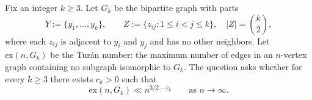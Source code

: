 Fix an integer $k\ge 3$.
Let $G_k$ be the bipartite graph with parts
\[
Y:=\{y_1,\dots,y_k\},\qquad Z:=\{z_{ij}: 1\le i<j\le k\},\quad |Z|=\binom{k}{2},
\]
where each $z_{ij}$ is adjacent to $y_i$ and $y_j$ and has no other neighbors.
Let $\mathrm{ex}(n,G_k)$ be the Tur\'an number: the maximum number of edges in an $n$-vertex graph containing no subgraph isomorphic to $G_k$.
The question asks whether for every $k\ge 3$ there exists $c_k>0$ such that
\[
\mathrm{ex}(n,G_k) \ll n^{3/2-c_k}
\qquad\text{as } n\to\infty.
\]
